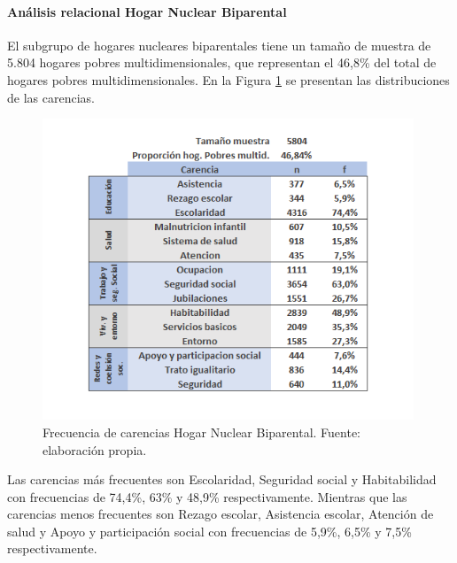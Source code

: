 \documentclass[12pt,letterpaper,spanish]{article}
\begin{document}
\paragraph{Análisis relacional Hogar Nuclear Biparental}
El subgrupo de hogares nucleares biparentales tiene un tamaño de muestra de 5.804 hogares pobres multidimensionales, que representan el 46,8\% del total de hogares pobres multidimensionales. En la Figura \ref{freBinuc} se presentan las distribuciones de las carencias.
\begin{figure}[H]
  \centering
    \includegraphics[height=9cm]{HOGARES/tabla_binuc.png}
    \caption{Frecuencia de carencias Hogar Nuclear Biparental. Fuente: elaboración propia.}
    \label{freBinuc}
\end{figure}
Las carencias más frecuentes son Escolaridad, Seguridad social y Habitabilidad con frecuencias de 74,4\%, 63\% y 48,9\% respectivamente. Mientras que las carencias menos frecuentes son Rezago escolar, Asistencia escolar, Atención de salud y Apoyo y participación social con frecuencias de 5,9\%, 6,5\% y 7,5\% respectivamente.
\end{document}
